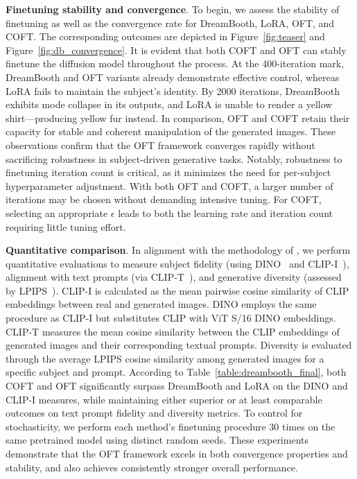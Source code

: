 \textbf{Finetuning stability and convergence}. To begin, we assess the stability of finetuning as well as the convergence rate for DreamBooth, LoRA, OFT, and COFT. The corresponding outcomes are depicted in Figure~\ref{fig:teaser} and Figure~\ref{fig:db_convergence}. It is evident that both COFT and OFT can stably finetune the diffusion model throughout the process. At the 400-iteration mark, DreamBooth and OFT variants already demonstrate effective control, whereas LoRA fails to maintain the subject's identity. By 2000 iterations, DreamBooth exhibits mode collapse in its outputs, and LoRA is unable to render a yellow shirt—producing yellow fur instead. In comparison, OFT and COFT retain their capacity for stable and coherent manipulation of the generated images. These observations confirm that the OFT framework converges rapidly without sacrificing robustness in subject-driven generative tasks. Notably, robustness to finetuning iteration count is critical, as it minimizes the need for per-subject hyperparameter adjustment. With both OFT and COFT, a larger number of iterations may be chosen without demanding intensive tuning. For COFT, selecting an appropriate $\epsilon$ leads to both the learning rate and iteration count requiring little tuning effort.

\textbf{Quantitative comparison}. In alignment with the methodology of \cite{ruiz2023dreambooth}, we perform quantitative evaluations to measure subject fidelity (using DINO~\cite{caron2021emerging} and CLIP-I~\cite{radford2021learning}), alignment with text prompts (via CLIP-T~\cite{radford2021learning}), and generative diversity (assessed by LPIPS~\cite{zhang2018unreasonable}). CLIP-I is calculated as the mean pairwise cosine similarity of CLIP embeddings between real and generated images. DINO employs the same procedure as CLIP-I but substitutes CLIP with ViT S/16 DINO embeddings. CLIP-T measures the mean cosine similarity between the CLIP embeddings of generated images and their corresponding textual prompts. Diversity is evaluated through the average LPIPS cosine similarity among generated images for a specific subject and prompt. According to Table~\ref{table:dreambooth_final}, both COFT and OFT significantly surpass DreamBooth and LoRA on the DINO and CLIP-I measures, while maintaining either superior or at least comparable outcomes on text prompt fidelity and diversity metrics. To control for stochasticity, we perform each method’s finetuning procedure 30 times on the same pretrained model using distinct random seeds. These experiments demonstrate that the OFT framework excels in both convergence properties and stability, and also achieves consistently stronger overall performance.

